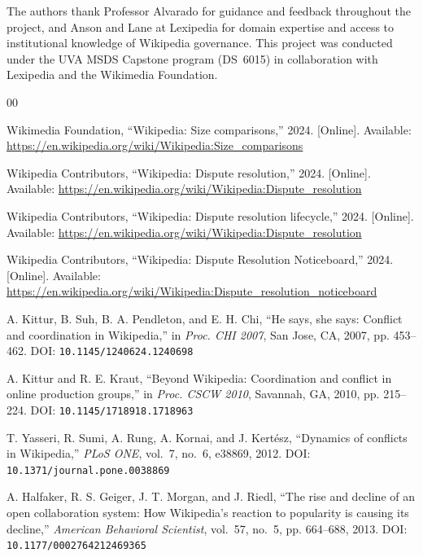 \documentclass[conference]{IEEEtran}
\begin{document}
The authors thank Professor Alvarado for guidance and feedback throughout the
project, and Anson and Lane at Lexipedia for domain expertise and access to
institutional knowledge of Wikipedia governance. This project was conducted
under the UVA MSDS Capstone program (DS~6015) in collaboration with Lexipedia
and the Wikimedia Foundation.

\begin{thebibliography}{00}

Wikimedia Foundation, ``Wikipedia: Size comparisons,'' 2024.
[Online]. Available: \url{https://en.wikipedia.org/wiki/Wikipedia:Size_comparisons}

Wikipedia Contributors, ``Wikipedia: Dispute resolution,'' 2024.
[Online]. Available: \url{https://en.wikipedia.org/wiki/Wikipedia:Dispute_resolution}

Wikipedia Contributors, ``Wikipedia: Dispute resolution lifecycle,'' 2024.
[Online]. Available: \url{https://en.wikipedia.org/wiki/Wikipedia:Dispute_resolution}

Wikipedia Contributors, ``Wikipedia: Dispute Resolution Noticeboard,'' 2024.
[Online]. Available: \url{https://en.wikipedia.org/wiki/Wikipedia:Dispute_resolution_noticeboard}

A. Kittur, B. Suh, B. A. Pendleton, and E. H. Chi,
``He says, she says: Conflict and coordination in Wikipedia,''
in \textit{Proc. CHI 2007}, San Jose, CA, 2007, pp. 453--462.
DOI: \texttt{10.1145/1240624.1240698}

A. Kittur and R. E. Kraut,
``Beyond Wikipedia: Coordination and conflict in online production groups,''
in \textit{Proc. CSCW 2010}, Savannah, GA, 2010, pp. 215--224.
DOI: \texttt{10.1145/1718918.1718963}

T. Yasseri, R. Sumi, A. Rung, A. Kornai, and J. Kert\'esz,
``Dynamics of conflicts in Wikipedia,''
\textit{PLoS ONE}, vol.~7, no.~6, e38869, 2012.
DOI: \texttt{10.1371/journal.pone.0038869}

A. Halfaker, R. S. Geiger, J. T. Morgan, and J. Riedl,
``The rise and decline of an open collaboration system: How Wikipedia's
reaction to popularity is causing its decline,''
\textit{American Behavioral Scientist}, vol.~57, no.~5, pp. 664--688, 2013.
DOI: \texttt{10.1177/0002764212469365}


\end{thebibliography}
\end{document}

